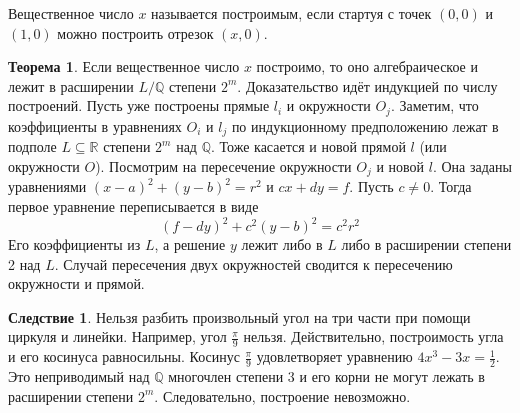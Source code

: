 \documentclass[10pt,a4paper,oneside]{book}
\theoremstyle{definition}
\newtheorem*{defn}{{\color{yellow!20!red} Определение}}
\newtheorem{thm}{{\color{red!40!black} Теорема}}
\newtheorem{cor}{Следствие}
\newcommand{\mb}[1]{\mathbb{#1}}
\def\thrm{\begin{thm}}
\def\ethrm{\end{thm}}
\def\dfn{\begin{defn}}
\def\edfn{\end{defn}}
\def\crl{\begin{cor}}
\def\ecrl{\end{cor}}
\begin{document}
Вещественное число $x$ называется построимым, если стартуя с точек $(0,0)$ и $(1,0)$ можно построить отрезок $(x,0)$. 

\thrm Если вещественное число $x$ построимо, то оно алгебраическое и лежит в расширении $L/\mb Q$ степени $2^m$.
\proof Доказательство идёт индукцией по числу построений. Пусть уже построены прямые $l_i$ и окружности $O_j$. Заметим, что коэффициенты в уравнениях $O_i$ и $l_j$ по индукционному предположению лежат в подполе $L\subseteq \mb R$ степени $2^m$ над $\mb Q$. Тоже касается и новой прямой $l$ (или окружности $O$). Посмотрим на пересечение окружности $O_j$ и новой $l$. Она заданы уравнениями $(x-a)^2+(y-b)^2=r^2$ и $cx+dy=f$. Пусть $c\neq 0$. Тогда первое уравнение переписывается в виде $$(f-dy)^2+c^2(y-b)^2=c^2r^2$$
Его коэффициенты из $L$, а решение $y$ лежит либо в $L$ либо в расширении степени 2 над $L$. Случай пересечения двух окружностей сводится к пересечению окружности и прямой.  
\endproof
\ethrm

\crl
Нельзя разбить произвольный угол на три части при помощи циркуля и линейки.
\proof Например, угол $\frac{\pi}{9}$ нельзя. Действительно, построимость угла и его косинуса равносильны. Косинус $\frac{\pi}{9}$ удовлетворяет уравнению $4x^3-3x=\frac{1}{2}$. Это неприводимый над $\mb Q$ многочлен степени 3 и его корни не могут лежать в расширении степени $2^m$. Следовательно, построение невозможно. 
\endproof
\ecrl

\begin{comment}

\dfn Пусть $K$ -- поле, $f(x)\in K[x]$. Тогда поле $L$ называется полем разложения $f$, если над $L$ многочлен $f$  раскладывается на линейные множители $f(x)=\prod (x-\alpha_i)$ и $L=K[\alpha_1,\dots,\alpha_n]$.
\edfn



\thrm Поле разложения многочлена существует и единственно.
\ethrm
\proof Прежде всего заметим, что мы уже знаем алгоритм построения поля разложения. Действительно. Для этого разложим $f$ на неприводимые множители $f=f_1\dots f_k$ и рассмотрим $L_1=K[\alpha_1]$, где $\alpha_1$ корень $f_1$. Над $L_1$  рассмотрим $f(x)/(x-\alpha_1)$ и построим его поле разложения над $L_1$, которое есть по индукционному предположению. Это и будет искомое $L$. Действительно, многочлен $f$ точно раскладывается над $L$ на линейные множители.  Далее, $L=L_1[\alpha_2,\dots,\alpha_n]$, то есть любой элемент этого поля есть многочлен от $\alpha_i$ с коэффициентами из $L_1$, которые есть многочлены от $\alpha_1$. Осталось раскрыть скобки.
\endproof

\end{comment}
\end{document}
